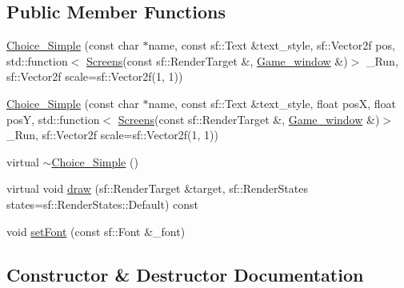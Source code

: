 \subsection*{Public Member Functions}
\begin{DoxyCompactItemize}
\item 
\hyperlink{class_choice___simple_a1c6491d57b337a1f6b795ef82b3fdf79}{Choice\+\_\+\+Simple} (const char $\ast$name, const sf\+::\+Text \&text\+\_\+style, sf\+::\+Vector2f pos, std\+::function$<$ \hyperlink{_globals_8h_a3d5776bab98402b03be09156bacf4f68}{Screens}(const sf\+::\+Render\+Target \&, \hyperlink{class_game__window}{Game\+\_\+window} \&)$>$ \+\_\+\+Run, sf\+::\+Vector2f scale=sf\+::\+Vector2f(1, 1))
\item 
\hyperlink{class_choice___simple_a1d189a21d6decdf65cfa88cf90b4cdf2}{Choice\+\_\+\+Simple} (const char $\ast$name, const sf\+::\+Text \&text\+\_\+style, float posX, float posY, std\+::function$<$ \hyperlink{_globals_8h_a3d5776bab98402b03be09156bacf4f68}{Screens}(const sf\+::\+Render\+Target \&, \hyperlink{class_game__window}{Game\+\_\+window} \&)$>$ \+\_\+\+Run, sf\+::\+Vector2f scale=sf\+::\+Vector2f(1, 1))
\item 
virtual \hyperlink{class_choice___simple_a6d5b3fe8aa2969f8eaffa4e5fd3b47d9}{$\sim$\+Choice\+\_\+\+Simple} ()
\item 
virtual void \hyperlink{class_choice___simple_ae8f4cedc34a10d3c35efce8cec1bec54}{draw} (sf\+::\+Render\+Target \&target, sf\+::\+Render\+States states=sf\+::\+Render\+States\+::\+Default) const
\item 
void \hyperlink{class_choice___simple_a035e32f90e4561b666b6571bce06e207}{set\+Font} (const sf\+::\+Font \&\+\_\+font)
\end{DoxyCompactItemize}


\subsection{Constructor \& Destructor Documentation}
\mbox{\label{class_choice___simple_a1c6491d57b337a1f6b795ef82b3fdf79}} 
